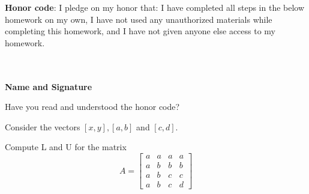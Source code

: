 \documentclass[solution,addpoints,12pt]{exam}
\begin{document}
\noindent \textbf{Honor code}: I pledge on my honor that: I have completed all steps in the below homework on my own, I have not used any unauthorized materials while completing this homework, and I have not given anyone else access to my homework.
\\~\\~\\
\begin{flushright}
\textbf{Name and Signature}

\end{flushright}


\begin{questions}

\question[1] Have you read and understood the honor code?
\begin{solution}

\end{solution}

\question[2] Consider the vectors $[x, y], [a,b]$ and $[c, d]$. 




\question[1] 
Compute L and U for the matrix\\
$$A = \begin{bmatrix}
a & a & a & a\\
a & b & b & b\\
a & b & c & c\\
a & b & c & d
\end{bmatrix}$$


\end{questions}
\end{document}
